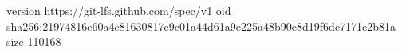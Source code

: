 version https://git-lfs.github.com/spec/v1
oid sha256:21974816e60a4e81630817e9c01a44d61a9e225a48b90e8d19f6de7171e2b81a
size 110168
